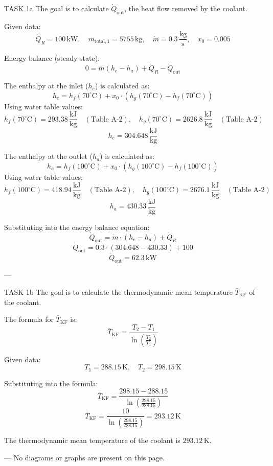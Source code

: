 TASK 1a  
The goal is to calculate \( \dot{Q}_{\text{out}} \), the heat flow removed by the coolant.  

Given data:  
\[
\dot{Q}_R = 100 \, \text{kW}, \quad m_{\text{total},1} = 5755 \, \text{kg}, \quad \dot{m} = 0.3 \, \frac{\text{kg}}{\text{s}}, \quad x_0 = 0.005
\]  

Energy balance (steady-state):  
\[
0 = \dot{m} (h_e - h_a) + \dot{Q}_R - \dot{Q}_{\text{out}}
\]  

The enthalpy at the inlet (\( h_e \)) is calculated as:  
\[
h_e = h_f(70^\circ\text{C}) + x_0 \cdot \left( h_g(70^\circ\text{C}) - h_f(70^\circ\text{C}) \right)
\]  
Using water table values:  
\[
h_f(70^\circ\text{C}) = 293.38 \, \frac{\text{kJ}}{\text{kg}} \quad (\text{Table A-2}), \quad h_g(70^\circ\text{C}) = 2626.8 \, \frac{\text{kJ}}{\text{kg}} \quad (\text{Table A-2})
\]  
\[
h_e = 304.648 \, \frac{\text{kJ}}{\text{kg}}
\]  

The enthalpy at the outlet (\( h_a \)) is calculated as:  
\[
h_a = h_f(100^\circ\text{C}) + x_0 \cdot \left( h_g(100^\circ\text{C}) - h_f(100^\circ\text{C}) \right)
\]  
Using water table values:  
\[
h_f(100^\circ\text{C}) = 418.94 \, \frac{\text{kJ}}{\text{kg}} \quad (\text{Table A-2}), \quad h_g(100^\circ\text{C}) = 2676.1 \, \frac{\text{kJ}}{\text{kg}} \quad (\text{Table A-2})
\]  
\[
h_a = 430.33 \, \frac{\text{kJ}}{\text{kg}}
\]  

Substituting into the energy balance equation:  
\[
\dot{Q}_{\text{out}} = \dot{m} \cdot (h_e - h_a) + \dot{Q}_R
\]  
\[
\dot{Q}_{\text{out}} = 0.3 \cdot (304.648 - 430.33) + 100
\]  
\[
\dot{Q}_{\text{out}} = 62.3 \, \text{kW}
\]  

---

TASK 1b  
The goal is to calculate the thermodynamic mean temperature \( \bar{T}_{\text{KF}} \) of the coolant.  

The formula for \( \bar{T}_{\text{KF}} \) is:  
\[
\bar{T}_{\text{KF}} = \frac{T_2 - T_1}{\ln \left( \frac{T_2}{T_1} \right)}
\]  

Given data:  
\[
T_1 = 288.15 \, \text{K}, \quad T_2 = 298.15 \, \text{K}
\]  

Substituting into the formula:  
\[
\bar{T}_{\text{KF}} = \frac{298.15 - 288.15}{\ln \left( \frac{298.15}{288.15} \right)}
\]  
\[
\bar{T}_{\text{KF}} = \frac{10}{\ln \left( \frac{298.15}{288.15} \right)} = 293.12 \, \text{K}
\]  

The thermodynamic mean temperature of the coolant is \( 293.12 \, \text{K} \).  

---  
No diagrams or graphs are present on this page.